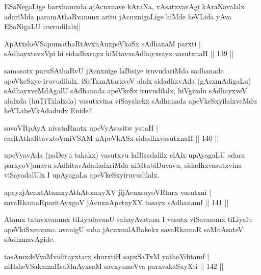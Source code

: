 \begin{artha}
ESaNegaLige barxhamxda ajAcnxnave kAraNa, vAsatxvavAgi kAraNavalalx adariMda paramAthaRvanunx aritu jAcnxnigaLige hiMde heVLida yAva ESaNigaLU iruvudilalx||
\end{artha}

\begin{shl}
ApAtxsheVSapumathaRtAvxnAnxpeVkaSx sAdhanaM parxti |\\
sAdhayxtevxV\s pi hi sidadhxsayx kiMtavxsAdhayxsayx vasutxnaH \hfill || 139 ||
\end{shl}

\begin{artha}
samasatx puruSAthaRvU jAcnxnige laBisiye iruvudariMda sadhanada apeVkeSxye iruvudilalx. iSaTxmAtarxveV alalx sidadhxvAda (gArxmAdigaLu) sAdhayxveMdAgalU sAdhanada apeVkeSx iruvudilalx, hiVgiralu sAdhayxveV alalxda (huTiTxlalxda) vasutxvina viSayakekx sAdhanada apeVkeSxyilalxveMdu heVLabeVkAdadudx Enide? 
\end{artha}

\begin{shl}
savoVRpAyA nivataRnatx upeVyAvasitw yataH |\\
caritAthaRtavxtoV\s miVSAM nApeVkASx sidadhxvasutxnaH \hfill || 140 ||
\end{shl}

\begin{artha}
upeVyavAda (paDeyu takakx) vasutxvu laBisadalilx elAlx upAyagaLU adara parxyoVjanavu sAdhitavAdadadxriMda niMtubiDuvavu, sidadhxvasutxvina viSayadalUlx I upAyagaLa apeVkeSxyiruvudilalx.
\end{artha}%


\begin{shl}
apayxjAcnxtAtamxyAthAtomxyXV jijAcnxsuyoVR\s tarx vasutxni |\\
savaRkamaRparitAyxgoV jAcnxnApetxyXY tasayx sAdhanamf \hfill || 141 ||
\end{shl}

\begin{artha}
Atamx tatavxvanunx tiLiyadavanU sahayAvatanu I vasutx viSavanunx tiLiyalu apeVkiSxsuvano. avanigU saha jAcnxnalABakekx savaRkamaR saMnAsateV sAdhanavAgide.
\end{artha}

\begin{shl}
tasAmxdeVvaMviditayxtarx shurxtiH sapxSaTxM yathoVditamf |\\
niHsheVSakamaRsaMnAyxsaM savxyameVva parxvakaSxyXti \hfill || 142 ||
\end{shl}

